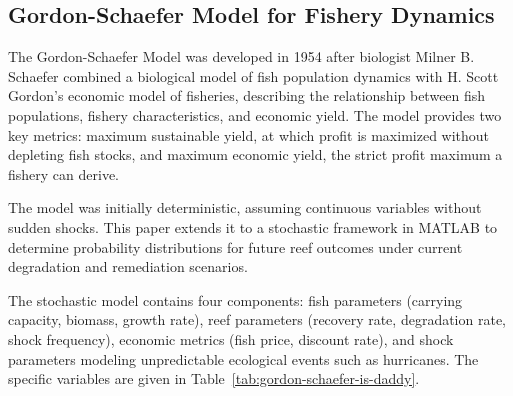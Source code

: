 \documentclass[10pt,letterpaper]{article}
\newcounter{metric}
\begin{document}
\subsection{Gordon-Schaefer Model for Fishery Dynamics}
The Gordon-Schaefer Model was developed in 1954 after biologist Milner B. Schaefer combined a biological model of fish population dynamics with H. Scott Gordon's economic model of fisheries, describing the relationship between fish populations, fishery characteristics, and economic yield. The model provides two key metrics: maximum sustainable yield, at which profit is maximized without depleting fish stocks, and maximum economic yield, the strict profit maximum a fishery can derive.

The model was initially deterministic, assuming continuous variables without sudden shocks. This paper extends it to a stochastic framework in MATLAB to determine probability distributions for future reef outcomes under current degradation and remediation scenarios.

The stochastic model contains four components: fish parameters (carrying capacity, biomass, growth rate), reef parameters (recovery rate, degradation rate, shock frequency), economic metrics (fish price, discount rate), and shock parameters modeling unpredictable ecological events such as hurricanes. The specific variables are given in Table~\ref{tab:gordon-schaefer-is-daddy}.
\end{document}
